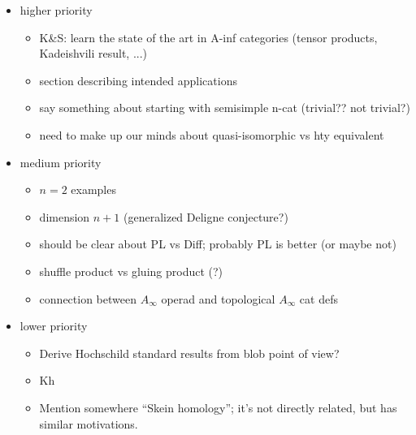 \documentclass[11pt,leqno]{amsart}
\begin{document}
\begin{itemize}
\item higher priority
\begin{itemize}
\item K\&S: learn the state of the art in A-inf categories
(tensor products, Kadeishvili result, ...)
\item section describing intended applications
\item say something about starting with semisimple n-cat (trivial?? not trivial?)
\item need to make up our minds about quasi-isomorphic vs hty equivalent
\end{itemize}
\item medium priority
\begin{itemize}
\item $n=2$ examples
\item dimension $n+1$ (generalized Deligne conjecture?)
\item should be clear about PL vs Diff; probably PL is better
(or maybe not)
\item shuffle product vs gluing product (?)
\item connection between $A_\infty$ operad and topological $A_\infty$ cat defs
\end{itemize}
\item lower priority
\begin{itemize}
\item Derive Hochschild standard results from blob point of view?
\item Kh
\item Mention somewhere \cite{MR1624157} ``Skein homology''; it's not directly related, but has similar motivations.
\end{itemize}
\end{itemize}


















% 

% 


\end{document}
